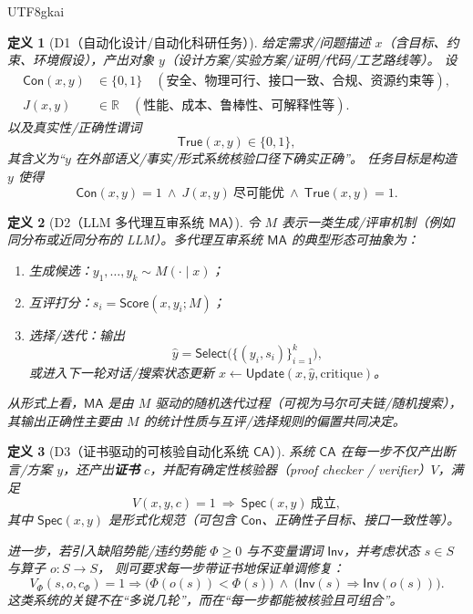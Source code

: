 \documentclass[12pt]{article}
\newtheorem{definition}{定义}[section]
\newcommand{\RR}{\mathbb{R}}
\begin{document}
\begin{CJK*}{UTF8}{gkai}
\begin{definition}[D1（自动化设计/自动化科研任务）]
\label{def:tex27-ch17-d1}
给定需求/问题描述 $x$（含目标、约束、环境假设），产出对象 $y$（设计方案/实验方案/证明/代码/工艺路线等）。
设
\[
  \begin{aligned}
    \mathsf{Con}(x,y)&\in\{0,1\}\quad(\text{安全、物理可行、接口一致、合规、资源约束等}),\\
    J(x,y)&\in\RR\quad(\text{性能、成本、鲁棒性、可解释性等}).
  \end{aligned}
\]
以及真实性/正确性谓词
\[
  \mathsf{True}(x,y)\in\{0,1\},
\]
其含义为“$y$ 在外部语义/事实/形式系统核验口径下确实正确”。
任务目标是构造 $y$ 使得
\[
  \mathsf{Con}(x,y)=1
  \ \wedge\
  J(x,y)\ \text{尽可能优}
  \ \wedge\
  \mathsf{True}(x,y)=1.
\]
\end{definition}

\begin{definition}[D2（LLM 多代理互审系统 $\mathsf{MA}$）]
\label{def:tex27-ch17-d2}
令 $M$ 表示一类生成/评审机制（例如同分布或近同分布的 LLM）。多代理互审系统 $\mathsf{MA}$ 的典型形态可抽象为：
\begin{enumerate}
  \item 生成候选：$y_1,\dots,y_k \sim M(\cdot\mid x)$；
  \item 互评打分：$s_i=\mathsf{Score}(x,y_i;M)$；
  \item 选择/迭代：输出
  \[
    \hat y=\mathsf{Select}\bigl(\{(y_i,s_i)\}_{i=1}^{k}\bigr),
  \]
  或进入下一轮对话/搜索状态更新 $x\leftarrow \mathsf{Update}(x,\hat y,\mathrm{critique})$。
\end{enumerate}
从形式上看，$\mathsf{MA}$ 是由 $M$ 驱动的随机迭代过程（可视为马尔可夫链/随机搜索），
其输出正确性主要由 $M$ 的统计性质与互评/选择规则的偏置共同决定。
\end{definition}

\begin{definition}[D3（证书驱动的可核验自动化系统 $\mathsf{CA}$）]
\label{def:tex27-ch17-d3}
系统 $\mathsf{CA}$ 在每一步不仅产出断言/方案 $y$，还产出\textbf{证书} $c$，并配有确定性核验器（proof checker / verifier）$V$，满足
\[
  V(x,y,c)=1\ \Longrightarrow\ \mathsf{Spec}(x,y)\ \text{成立},
\]
其中 $\mathsf{Spec}(x,y)$ 是形式化规范（可包含 $\mathsf{Con}$、正确性子目标、接口一致性等）。

进一步，若引入缺陷势能/违约势能 $\Phi\ge 0$ 与不变量谓词 $\mathsf{Inv}$，并考虑状态 $s\in S$ 与算子 $o:S\to S$，
则可要求每一步带证书地保证单调修复：
\[
  V_\Phi(s,o,c_\Phi)=1
  \Longrightarrow
  \bigl(\Phi(o(s))<\Phi(s)\bigr)\ \wedge\ \bigl(\mathsf{Inv}(s)\Rightarrow \mathsf{Inv}(o(s))\bigr).
\]
这类系统的关键不在“多说几轮”，而在“每一步都能被核验且可组合”。
\end{definition}


\end{CJK*}
\end{document}
